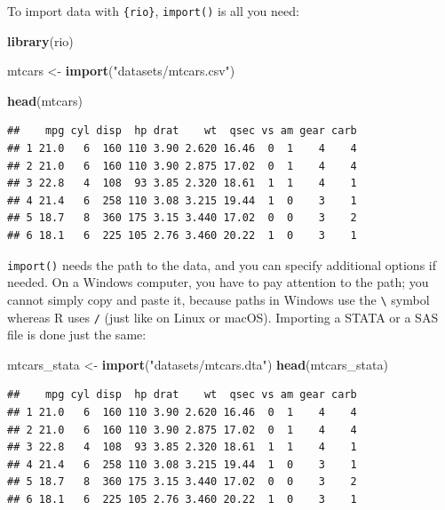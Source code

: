 \documentclass[]{gitbook}
\newenvironment{Shaded}{\begin{snugshade}}{\end{snugshade}}
\newcommand{\KeywordTok}[1]{\textcolor[rgb]{0.13,0.29,0.53}{\textbf{#1}}}
\newcommand{\NormalTok}[1]{#1}
\newcommand{\StringTok}[1]{\textcolor[rgb]{0.31,0.60,0.02}{#1}}
\begin{document}
To import data with \texttt{\{rio\}}, \texttt{import()} is all you need:

\begin{Shaded}
\begin{Highlighting}[]
\KeywordTok{library}\NormalTok{(rio)}

\NormalTok{mtcars <-}\StringTok{ }\KeywordTok{import}\NormalTok{(}\StringTok{"datasets/mtcars.csv"}\NormalTok{)}
\end{Highlighting}
\end{Shaded}

\begin{Shaded}
\begin{Highlighting}[]
\KeywordTok{head}\NormalTok{(mtcars)}
\end{Highlighting}
\end{Shaded}

\begin{verbatim}
##    mpg cyl disp  hp drat    wt  qsec vs am gear carb
## 1 21.0   6  160 110 3.90 2.620 16.46  0  1    4    4
## 2 21.0   6  160 110 3.90 2.875 17.02  0  1    4    4
## 3 22.8   4  108  93 3.85 2.320 18.61  1  1    4    1
## 4 21.4   6  258 110 3.08 3.215 19.44  1  0    3    1
## 5 18.7   8  360 175 3.15 3.440 17.02  0  0    3    2
## 6 18.1   6  225 105 2.76 3.460 20.22  1  0    3    1
\end{verbatim}

\texttt{import()} needs the path to the data, and you can specify additional options if needed. On a
Windows computer, you have to pay attention to the path; you cannot simply copy and paste it, because
paths in Windows use the \texttt{\textbackslash{}} symbol whereas R uses \texttt{/} (just like on Linux or macOS).
Importing a STATA or a SAS file is done just the same:

\begin{Shaded}
\begin{Highlighting}[]
\NormalTok{mtcars_stata <-}\StringTok{ }\KeywordTok{import}\NormalTok{(}\StringTok{"datasets/mtcars.dta"}\NormalTok{)}
\KeywordTok{head}\NormalTok{(mtcars_stata)}
\end{Highlighting}
\end{Shaded}

\begin{verbatim}
##    mpg cyl disp  hp drat    wt  qsec vs am gear carb
## 1 21.0   6  160 110 3.90 2.620 16.46  0  1    4    4
## 2 21.0   6  160 110 3.90 2.875 17.02  0  1    4    4
## 3 22.8   4  108  93 3.85 2.320 18.61  1  1    4    1
## 4 21.4   6  258 110 3.08 3.215 19.44  1  0    3    1
## 5 18.7   8  360 175 3.15 3.440 17.02  0  0    3    2
## 6 18.1   6  225 105 2.76 3.460 20.22  1  0    3    1
\end{verbatim}
\end{document}
